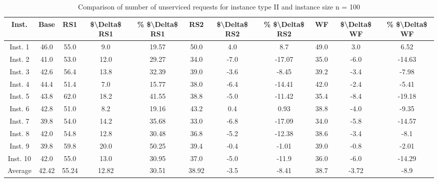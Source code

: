 \begin{table}[H]
\centering
\begin{tabular}{ccccccccccc}
  \hline
  \textbf{Inst.} & \textbf{Base} & \textbf{RS1} & \textbf{\$\textbackslash{}Delta\$  RS1} & \textbf{\% \$\textbackslash{}Delta\$  RS1} & \textbf{RS2} & \textbf{\$\textbackslash{}Delta\$  RS2} & \textbf{\% \$\textbackslash{}Delta\$  RS2} & \textbf{WF} & \textbf{\$\textbackslash{}Delta\$  WF} & \textbf{\% \$\textbackslash{}Delta\$  WF} \\\hline
  Inst. 1 & 46.0 & 55.0 & 9.0 & 19.57 & 50.0 & 4.0 & 8.7 & 49.0 & 3.0 & 6.52 \\
  Inst. 2 & 41.0 & 53.0 & 12.0 & 29.27 & 34.0 & -7.0 & -17.07 & 35.0 & -6.0 & -14.63 \\
  Inst. 3 & 42.6 & 56.4 & 13.8 & 32.39 & 39.0 & -3.6 & -8.45 & 39.2 & -3.4 & -7.98 \\
  Inst. 4 & 44.4 & 51.4 & 7.0 & 15.77 & 38.0 & -6.4 & -14.41 & 42.0 & -2.4 & -5.41 \\
  Inst. 5 & 43.8 & 62.0 & 18.2 & 41.55 & 38.8 & -5.0 & -11.42 & 35.4 & -8.4 & -19.18 \\
  Inst. 6 & 42.8 & 51.0 & 8.2 & 19.16 & 43.2 & 0.4 & 0.93 & 38.8 & -4.0 & -9.35 \\
  Inst. 7 & 39.8 & 54.0 & 14.2 & 35.68 & 33.0 & -6.8 & -17.09 & 34.0 & -5.8 & -14.57 \\
  Inst. 8 & 42.0 & 54.8 & 12.8 & 30.48 & 36.8 & -5.2 & -12.38 & 38.6 & -3.4 & -8.1 \\
  Inst. 9 & 39.8 & 59.8 & 20.0 & 50.25 & 39.4 & -0.4 & -1.01 & 39.0 & -0.8 & -2.01 \\
  Inst. 10 & 42.0 & 55.0 & 13.0 & 30.95 & 37.0 & -5.0 & -11.9 & 36.0 & -6.0 & -14.29 \\
  Average & 42.42 & 55.24 & 12.82 & 30.51 & 38.92 & -3.5 & -8.41 & 38.7 & -3.72 & -8.9 \\\hline
\end{tabular}
\caption{Comparison of number of unserviced requests for instance type II and instance size n = 100}
\label{tab:wait:resrelocation-nTaxi-comparison_II_100}
\end{table}
